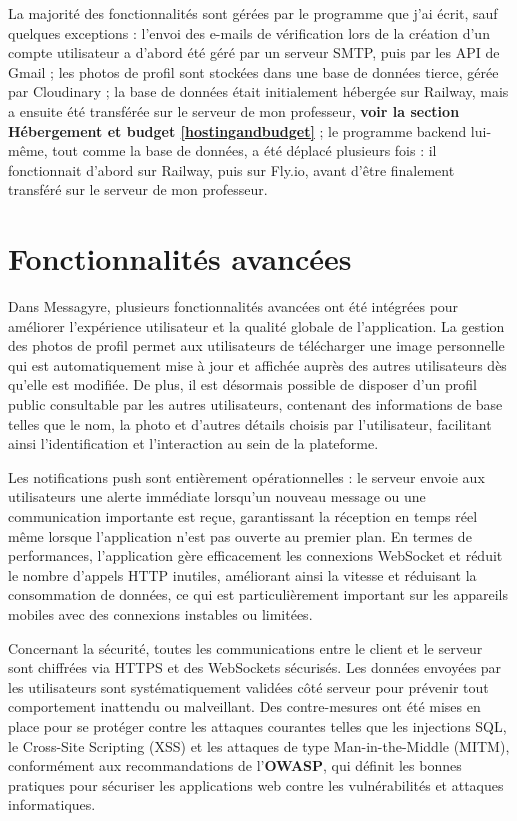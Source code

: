 \documentclass[12pt]{report}
\begin{document}
	La majorité des fonctionnalités sont gérées par le programme que j’ai écrit, sauf quelques exceptions : l’envoi des e-mails de vérification lors de la création d’un compte utilisateur a d’abord été géré par un serveur SMTP\supercite{smtp}, puis par les API de Gmail\supercite{googleapi} ; les photos de profil sont stockées dans une base de données tierce, gérée par Cloudinary\supercite{cloudinary} ; la base de données était initialement hébergée sur Railway\supercite{railway}, mais a ensuite été transférée sur le serveur de mon professeur, \textbf{voir la section Hébergement et budget \ref{hostingandbudget}} ; le programme backend lui-même, tout comme la base de données, a été déplacé plusieurs fois : il fonctionnait d’abord sur Railway\supercite{railway}, puis sur Fly.io\supercite{flyio}, avant d’être finalement transféré sur le serveur de mon professeur.
	
	\section{Fonctionnalités avancées}
	
	Dans Messagyre, plusieurs fonctionnalités avancées ont été intégrées pour améliorer l'expérience utilisateur et la qualité globale de l'application. La gestion des photos de profil permet aux utilisateurs de télécharger une image personnelle qui est automatiquement mise à jour et affichée auprès des autres utilisateurs dès qu'elle est modifiée\supercite{cloudinary}. De plus, il est désormais possible de disposer d'un profil public consultable par les autres utilisateurs, contenant des informations de base telles que le nom, la photo et d'autres détails choisis par l'utilisateur, facilitant ainsi l'identification et l'interaction au sein de la plateforme.
	
	Les notifications push sont entièrement opérationnelles : le serveur envoie aux utilisateurs une alerte immédiate lorsqu'un nouveau message ou une communication importante est reçue, garantissant la réception en temps réel même lorsque l'application n'est pas ouverte au premier plan\supercite{firebase}. En termes de performances, l'application gère efficacement les connexions WebSocket\supercite{websocket} et réduit le nombre d'appels HTTP inutiles\supercite{http}, améliorant ainsi la vitesse et réduisant la consommation de données, ce qui est particulièrement important sur les appareils mobiles avec des connexions instables ou limitées.
	
	Concernant la sécurité, toutes les communications entre le client et le serveur sont chiffrées via HTTPS et des WebSockets sécurisés. Les données envoyées par les utilisateurs sont systématiquement validées côté serveur pour prévenir tout comportement inattendu ou malveillant. Des contre-mesures ont été mises en place pour se protéger contre les attaques courantes telles que les injections SQL, le Cross-Site Scripting (XSS) et les attaques de type Man-in-the-Middle (MITM), conformément aux recommandations de l'\textbf{OWASP}\supercite{owasp}, qui définit les bonnes pratiques pour sécuriser les applications web contre les vulnérabilités et attaques informatiques.
	
\end{document}
